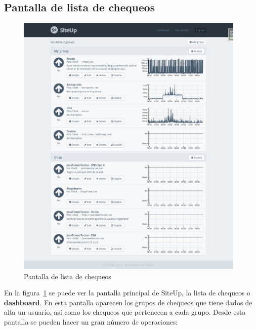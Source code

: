 
\subsection{Pantalla de lista de chequeos}

\begin{figure}[htbp]
  \centering
  \includegraphics[width=\textwidth]{5_diseno/web-dashboard}
  \caption{Pantalla de lista de chequeos}
  \label{fig:web-dashboard}
\end{figure}

En la figura~\ref{fig:web-dashboard} se puede ver la pantalla principal de
SiteUp, la lista de chequeos o \textbf{dashboard}. En esta pantalla aparecen los
grupos de chequeos que tiene dados de alta un usuario, así como los chequeos que
pertenecen a cada grupo. Desde esta pantalla se pueden hacer un gran número de
operaciones:

